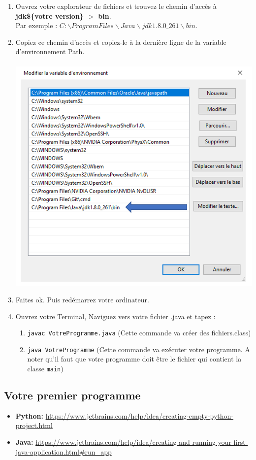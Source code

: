 \begin{enumerate}
    \item Ouvrez votre explorateur de fichiers et trouvez le chemin d'accès à \textbf{jdk\$\{votre version\} $>$ bin}. \\Par exemple : $C:\backslash Program Files\backslash Java\backslash jdk1.8.0\_261\backslash bin.$\\
    \item Copiez ce chemin d'accès et copiez-le à la dernière ligne de la variable d'environnement Path.\\\
    \includegraphics[width=15cm]{img/Res3.PNG}\\
    \item Faites ok. Puis redémarrez votre ordinateur.
    \item Ouvrez votre Terminal, Naviguez vers votre fichier .java et tapez :
        \begin{enumerate}
            \item \lstinline{javac VotreProgramme.java} (Cette commande va créer des fichiers.class)
            \item \lstinline{java VotreProgramme} (Cette commande va exécuter votre programme. A noter qu'il faut que votre programme doit être le fichier qui contient la classe \lstinline{main})
        \end{enumerate}
    
\end{enumerate}


\subsection*{Votre premier programme}

\begin{itemize}
    \item \textbf{Python: }\url{https://www.jetbrains.com/help/idea/creating-empty-python-project.html}
    \item \textbf{Java: }\url{https://www.jetbrains.com/help/idea/creating-and-running-your-first-java-application.html#run_app}
\end{itemize}


